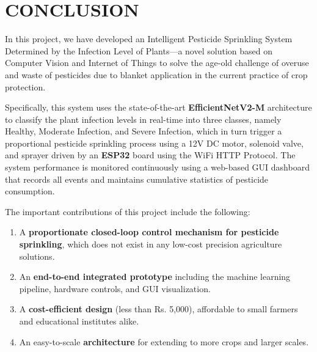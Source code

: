 \documentclass[12pt,a4paper,oneside]{report}
\begin{document}
\chapter{CONCLUSION}
In this project, we have developed an Intelligent Pesticide Sprinkling System Determined by the Infection Level of Plants—a novel solution based on Computer Vision and Internet of Things to solve the age-old challenge of overuse and waste of pesticides due to blanket application in the current practice of crop protection.

Specifically, this system uses the state-of-the-art \textbf{EfficientNetV2-M} architecture to classify the plant infection levels in real-time into three classes, namely Healthy, Moderate Infection, and Severe Infection, which in turn trigger a proportional pesticide sprinkling process using a 12V DC motor, solenoid valve, and sprayer driven by an \textbf{ESP32} board using the WiFi HTTP Protocol. The system performance is monitored continuously using a web-based GUI dashboard that records all events and maintains cumulative statistics of pesticide consumption.

The important contributions of this project include the following:
\begin{enumerate}[leftmargin=2em]
    \item A \textbf{proportionate closed-loop control mechanism for pesticide sprinkling}, which does not exist in any low-cost precision agriculture solutions.
    \item An \textbf{end-to-end integrated prototype} including the machine learning pipeline, hardware controls, and GUI visualization.
    \item A \textbf{cost-efficient design} (less than Rs. 5,000), affordable to small farmers and educational institutes alike.
    \item An easy-to-scale \textbf{architecture} for extending to more crops and larger scales.
\end{enumerate}
\end{document}
